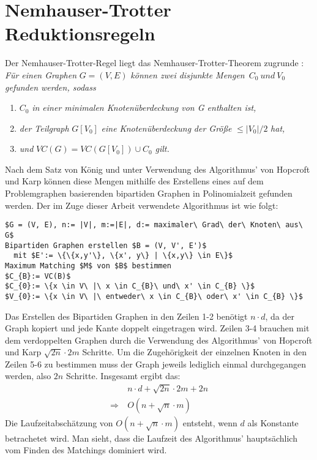 \section{Nemhauser-Trotter Reduktionsregeln}
\label{ch:Grundlagen:sec:Nemhauser-Trotter Reduktionsregeln}
Der Nemhauser-Trotter-Regel liegt das Nemhauser-Trotter-Theorem zugrunde \cite{trott}:
\textit{Für einen Graphen} $G=(V,E)$ \textit{können zwei disjunkte Mengen}\ $C_{0}\ und\ V_{0}$ \textit{gefunden werden, sodass}
\begin{enumerate}
\item $C_{0}$ \textit{ in einer minimalen Knotenüberdeckung von G enthalten ist,}
\item \textit{der Teilgraph }$G[V_{0}]$ \textit{eine Knotenüberdeckung} \textit{der Größe} $\leq |V_{0}| / 2$ \textit{ hat,}
\item \textit{und} $VC(G) = VC(G[V_{0}])\cup C_{0}$ \textit{ gilt.}
\end{enumerate}
Nach dem Satz von König und unter Verwendung des Algorithmus' von Hopcroft und Karp \cite{paper:6} können diese Mengen mithilfe des Erstellens eines auf dem Problemgraphen basierenden bipartiden Graphen in Polinomialzeit gefunden werden. Der im Zuge dieser Arbeit verwendete Algorithmus ist wie folgt:
\begin{lstlisting}[mathescape = true, basicstyle=\ttfamily]
$G = (V, E), n:= |V|, m:=|E|, d:= maximaler\ Grad\ der\ Knoten\ aus\ G$
Bipartiden Graphen erstellen $B = (V, V', E')$ 
  mit $E':= \{\{x,y'\}, \{x', y\} | \{x,y\} \in E\}$ 
Maximum Matching $M$ von $B$ bestimmen 
$C_{B}:= VC(B)$ 
$C_{0}:= \{x \in V\ |\ x \in C_{B}\ und\ x' \in C_{B} \}$ 
$V_{0}:= \{x \in V\ |\ entweder\ x \in C_{B}\ oder\ x' \in C_{B} \}$ 
\end{lstlisting}
Das Erstellen des Bipartiden Graphen in den Zeilen 1-2 benötigt $n \cdot d$, da der Graph kopiert und jede Kante doppelt eingetragen wird. Zeilen 3-4 brauchen mit dem verdoppelten Graphen durch die Verwendung des Algorithmus' von Hopcroft und Karp $\sqrt{2n} \cdot 2m$ Schritte. Um die Zugehörigkeit der einzelnen Knoten in den Zeilen 5-6 zu bestimmen muss der Graph jeweils lediglich einmal durchgegangen werden, also $2n$ Schritte. Insgesamt ergibt das:
\begin{align}
&\ n \cdot d + \sqrt{2n} \cdot 2m + 2n\\
\Rightarrow &\ O(n + \sqrt{n} \cdot m)
\end{align}
Die Laufzeitabschätzung von  $O(n + \sqrt{n} \cdot m)$ entsteht, wenn $d$ als Konstante betrachetet wird. Man sieht, dass die Laufzeit des Algorithmus' hauptsächlich vom Finden des Matchings dominiert wird.
